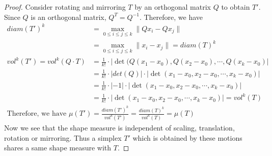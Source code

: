\begin{proof}
    Consider rotating and mirroring $T$ by an orthogonal matrix $Q$ to obtain $T'$. Since $Q$ is an orthogonal matrix, $Q^T = Q^{-1}$. Therefore, we have
    \begin{align*}
    diam(T')^k &= \max_{0\leqslant i\leqslant j\leqslant k} \|Qx_i - Qx_j\|\\
               &= \max_{0\leqslant i\leqslant j\leqslant k} \|x_i - x_j\| = diam(T)^k&&\\
    vol^k(T') = vol^k(Q\cdot T) &= \frac{1}{k!}\cdot |\det(Q(x_1-x_0), Q(x_2-x_0),\cdots, Q(x_k-x_0)|\\
                                &= \frac{1}{k!}\cdot|det(Q)|\cdot|\det(x_1-x_0, x_2-x_0, \cdots, x_k-x_0)|\\
                                &= \frac{1}{k!}\cdot|-1|\cdot|\det(x_1-x_0, x_2-x_0, \cdots, x_k-x_0)|\\
                                &= \frac{1}{k!}\cdot|\det(x_1-x_0, x_2-x_0, \cdots, x_k-x_0)| = vol^k(T)\\
    \text{Therefore, we have } \mu(T') &= \frac{diam(T')^k}{vol^k(T')} = \frac{diam(T)^k}{vol^k(T)} = \mu(T)
    \end{align*}
    Now we see that the shape measure is independent of scaling, translation, rotation or mirroring. Thus a simplex $T'$ which is obtained by these motions shares a same shape measure with $T$.
    \end{proof}